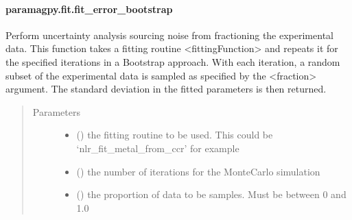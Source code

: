 \documentclass[a4paper,10pt,english,openany,oneside]{sphinxmanual}
\begin{document}
\paragraph{paramagpy.fit.fit\_error\_bootstrap}
\label{\detokenize{reference/generated/paramagpy.fit.fit_error_bootstrap:paramagpy-fit-fit-error-bootstrap}}\label{\detokenize{reference/generated/paramagpy.fit.fit_error_bootstrap::doc}}

\begin{fulllineitems}
\label{\detokenize{reference/generated/paramagpy.fit.fit_error_bootstrap:paramagpy.fit.fit_error_bootstrap}}
\sphinxAtStartPar
Perform uncertainty analysis sourcing noise from fractioning the
experimental data. This function takes a fitting routine \textless{}fittingFunction\textgreater{}
and repeats it for the specified iterations in a Bootstrap approach.
With each iteration, a random subset of the experimental data is sampled as
specified by the \textless{}fraction\textgreater{} argument. The standard deviation in the fitted
parameters is then returned.
\begin{quote}\begin{description}
\item[{Parameters}] \leavevmode\begin{itemize}
\item {} 
\sphinxAtStartPar
{} () \textendash{} the fitting routine to be used.
This could be ‘nlr\_fit\_metal\_from\_ccr’ for example

\item {} 
\sphinxAtStartPar
{} () \textendash{} the number of iterations for the Monte\sphinxhyphen{}Carlo simulation

\item {} 
\sphinxAtStartPar
{} () \textendash{} the proportion of data to be samples. Must be between 0 and 1.0


\end{itemize}
\end{description}
\end{quote}
\end{fulllineitems}
\end{document}
